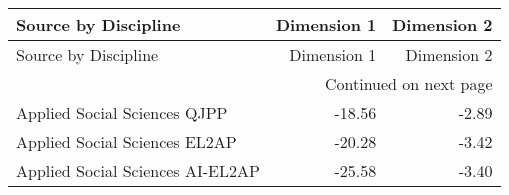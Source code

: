 \begin{longtable}{lrr}
\toprule
Source by Discipline & Dimension 1 & Dimension 2 \\
\midrule
\endfirsthead
\toprule
Source by Discipline & Dimension 1 & Dimension 2 \\
\midrule
\endhead
\midrule
\multicolumn{3}{r}{Continued on next page} \\
\midrule
\endfoot
\bottomrule
\endlastfoot
Applied Social Sciences QJPP & -18.56 & -2.89 \\
Applied Social Sciences EL2AP & -20.28 & -3.42 \\
Applied Social Sciences AI-EL2AP & -25.58 & -3.40 \\
\end{longtable}
